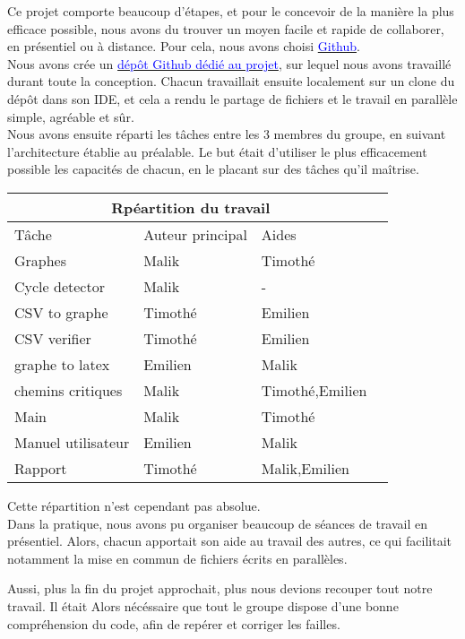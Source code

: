\documentclass{article}
\begin{document}
Ce projet comporte beaucoup d'étapes, et pour le concevoir de la manière la plus efficace possible,
nous avons du trouver un moyen facile et rapide de collaborer, en présentiel ou à distance.
Pour cela, nous avons choisi \href{https://github.com}{\textcolor{blue}{Github}}.\\
 Nous avons
crée un \href{https://github.com/Zertag/Projet-Graphes}{\textcolor{blue}{dépôt Github dédié au projet}}, sur lequel nous avons travaillé durant toute la conception.
Chacun travaillait ensuite localement
sur un clone du dépôt dans son IDE, et cela a rendu le partage de fichiers et le travail en parallèle simple, agréable et sûr.
\\
Nous avons ensuite réparti les tâches entre les 3 membres du groupe, en suivant l'architecture établie au préalable.
Le but était d'utiliser le plus efficacement possible les capacités de chacun, en le placant sur des tâches qu'il maîtrise. \\
\begin{center}
\begin{tabular}{ |p{3cm}||p{3cm}|p{3cm}|p{3cm}|  }
    \hline
    \multicolumn{3}{|c|}{Rpéartition du travail} \\
    \hline 
    Tâche&Auteur principal&Aides \\ 
    \hline 
    Graphes&Malik&Timothé \\
    Cycle detector&Malik&    -  \\
    CSV to graphe&Timothé&Emilien \\
    CSV verifier&Timothé&Emilien \\
    graphe to latex&Emilien&Malik \\
    chemins critiques&Malik&Timothé,Emilien \\
    Main&Malik&Timothé \\
    Manuel utilisateur&Emilien&Malik \\
    Rapport&Timothé&Malik,Emilien \\
    \hline
\end{tabular}
\end{center} 
Cette répartition n'est cependant pas absolue.\\
Dans la pratique, nous avons pu organiser beaucoup de séances de travail en présentiel.
Alors, chacun apportait son aide au travail des autres, ce qui facilitait notamment 
la mise en commun de fichiers écrits en parallèles.

Aussi, plus la fin du projet approchait, plus nous devions recouper tout notre travail. Il était Alors
nécéssaire que tout le groupe dispose d'une bonne compréhension du code, afin de repérer et corriger les failles.
\end{document}
